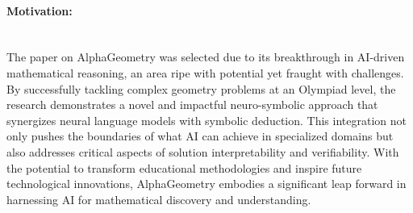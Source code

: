 \documentclass[12pt]{article}
\begin{document}
\paragraph{Motivation:}
~\\
The paper on AlphaGeometry was selected due to its breakthrough in AI-driven mathematical reasoning, an area ripe with potential yet fraught with challenges. By successfully tackling complex geometry problems at an Olympiad level, the research demonstrates a novel and impactful neuro-symbolic approach that synergizes neural language models with symbolic deduction. This integration not only pushes the boundaries of what AI can achieve in specialized domains but also addresses critical aspects of solution interpretability and verifiability. With the potential to transform educational methodologies and inspire future technological innovations, AlphaGeometry embodies a significant leap forward in harnessing AI for mathematical discovery and understanding.



\end{document}
